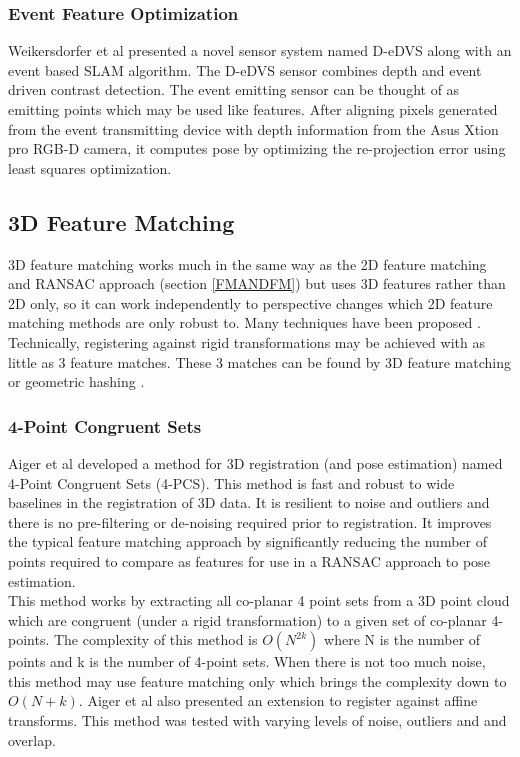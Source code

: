 \subsubsection{Event Feature Optimization}

Weikersdorfer et al \cite{Weikersdorfer14Event} presented a novel sensor system named D-eDVS along with an event based SLAM algorithm. The D-eDVS sensor combines depth and event driven contrast detection. The event emitting sensor can be thought of as emitting points which may be used like features. After aligning pixels generated from the event transmitting device with depth information from the Asus Xtion pro RGB-D camera, it computes pose by optimizing the re-projection error using least squares optimization.


\subsection{3D Feature Matching}

3D feature matching works much in the same way as the 2D feature matching and RANSAC approach (section \ref{FMANDFM}) but uses 3D features rather than 2D only, so it can work independently to perspective changes which 2D feature matching methods are only robust to. Many techniques have been proposed \cite{Scovanner073Dimensional,Flitton10Object,Li05Multiscale}. Technically, registering against rigid transformations may be achieved with as little as 3 feature matches. These 3 matches can be found by 3D feature matching or geometric hashing \cite{Wolfson97Geometric}.



\subsubsection{4-Point Congruent Sets}

Aiger et al \cite{Aiger084} developed a method for 3D registration (and pose estimation) named 4-Point Congruent Sets (4-PCS). This method is fast and robust to wide baselines in the registration of 3D data. It is resilient to noise and outliers and there is no pre-filtering or de-noising required prior to registration. It improves the typical feature matching approach by significantly reducing the number of points required to compare as features for use in a RANSAC approach to pose estimation. \\

This method works by extracting all co-planar 4 point sets from a 3D point cloud which are congruent (under a rigid transformation) to a given set of co-planar 4-points. The complexity of this method is $O(N^{2k})$ where N is the number of points and k is the number of 4-point sets. When there is not too much noise, this method may use feature matching only which brings the complexity down to $O(N+k)$. Aiger et al also presented an extension to register against affine transforms. This method was tested with varying levels of noise, outliers and and overlap. \\

